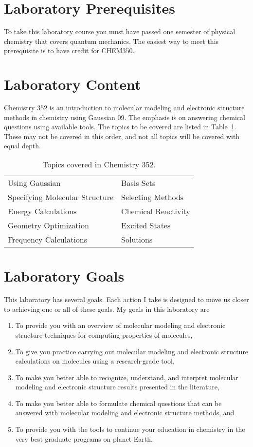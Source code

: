 \documentclass[letterpaper,oneside,onecolumn,11pt,article]{memoir}
\begin{document}
\section{Laboratory Prerequisites}
To take this laboratory course you must have passed one semester of physical chemistry that covers quantum mechanics. The easiest way to meet this prerequisite is to have credit for CHEM350. 

\section{Laboratory Content}
Chemistry 352 is an introduction to molecular modeling and electronic structure methods in chemistry using Gaussian 09. The emphasis is on answering chemical questions using available tools. The topics to be covered are listed in Table~\ref{tab:topics}. These may not be covered in this order, and not all topics will be covered with equal depth. 

\begin{table}[h]
\caption{\sffamily Topics covered in Chemistry 352.}
\label{tab:topics}
\begin{tabular}{l|l} \toprule
Using Gaussian & Basis Sets \\
Specifying Molecular Structure & Selecting Methods \\
Energy Calculations & Chemical Reactivity \\
Geometry Optimization & Excited States \\
Frequency Calculations & Solutions \\ 
\bottomrule
\end{tabular}
\end{table}

\section{Laboratory Goals}
This laboratory has several goals. Each action I take is designed to move us closer to achieving one or all of these goals. My goals in this laboratory are
\begin{enumerate}
\item To provide you with an overview of molecular modeling and electronic structure techniques for computing properties of molecules,
\item To give you practice carrying out molecular modeling and electronic structure calculations on molecules using a research-grade tool,
\item To make you better able to recognize, understand, and interpret molecular modeling and electronic structure results presented in the literature,
\item To make you better able to formulate chemical questions that can be answered with molecular modeling and electronic structure methods, and
\item To provide you with the tools to continue your education in chemistry in the very best graduate programs on planet Earth.
\end{enumerate}
\end{document}
